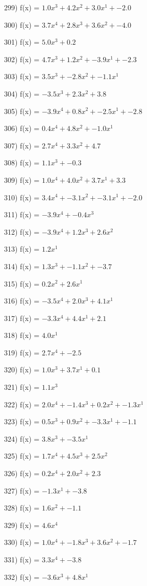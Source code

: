 \documentclass[10pt,a4paper]{article}
\begin{document}
299) f(x) = $1.0x^3 + 4.2x^2 + 3.0x^1 + -2.0$

300) f(x) = $3.7x^4 + 2.8x^3 + 3.6x^2 + -4.0$

301) f(x) = $5.0x^3 + 0.2$

302) f(x) = $4.7x^3 + 1.2x^2 + -3.9x^1 + -2.3$

303) f(x) = $3.5x^3 + -2.8x^2 + -1.1x^1$

304) f(x) = $-3.5x^3 + 2.3x^2 + 3.8$

305) f(x) = $-3.9x^4 + 0.8x^2 + -2.5x^1 + -2.8$

306) f(x) = $0.4x^4 + 4.8x^2 + -1.0x^1$

307) f(x) = $2.7x^4 + 3.3x^2 + 4.7$

308) f(x) = $1.1x^3 + -0.3$

309) f(x) = $1.0x^4 + 4.0x^2 + 3.7x^1 + 3.3$

310) f(x) = $3.4x^4 + -3.1x^2 + -3.1x^1 + -2.0$

311) f(x) = $-3.9x^4 + -0.4x^3$

312) f(x) = $-3.9x^4 + 1.2x^3 + 2.6x^2$

313) f(x) = $1.2x^1$

314) f(x) = $1.3x^3 + -1.1x^2 + -3.7$

315) f(x) = $0.2x^2 + 2.6x^1$

316) f(x) = $-3.5x^4 + 2.0x^3 + 4.1x^1$

317) f(x) = $-3.3x^4 + 4.4x^1 + 2.1$

318) f(x) = $4.0x^1$

319) f(x) = $2.7x^4 + -2.5$

320) f(x) = $1.0x^3 + 3.7x^1 + 0.1$

321) f(x) = $1.1x^3$

322) f(x) = $2.0x^4 + -1.4x^3 + 0.2x^2 + -1.3x^1$

323) f(x) = $0.5x^3 + 0.9x^2 + -3.3x^1 + -1.1$

324) f(x) = $3.8x^3 + -3.5x^1$

325) f(x) = $1.7x^4 + 4.5x^3 + 2.5x^2$

326) f(x) = $0.2x^4 + 2.0x^2 + 2.3$

327) f(x) = $-1.3x^1 + -3.8$

328) f(x) = $1.6x^2 + -1.1$

329) f(x) = $4.6x^4$

330) f(x) = $1.0x^4 + -1.8x^3 + 3.6x^2 + -1.7$

331) f(x) = $3.3x^4 + -3.8$

332) f(x) = $-3.6x^3 + 4.8x^1$
\end{document}
